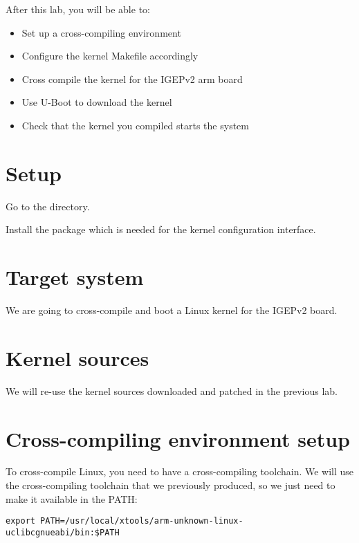 
After this lab, you will be able to:
\begin{itemize}
\item Set up a cross-compiling environment
\item Configure the kernel Makefile accordingly
\item Cross compile the kernel for the IGEPv2 arm board
\item Use U-Boot to download the kernel
\item Check that the kernel you compiled starts the system
\end{itemize}

\section{Setup}

Go to the  directory.

Install the package  which is needed for the
 kernel configuration interface.

\section{Target system}

We are going to cross-compile and boot a Linux kernel for the IGEPv2
board.

\section{Kernel sources}

We will re-use the kernel sources downloaded and patched in the
previous lab.

\section{Cross-compiling environment setup}

To cross-compile Linux, you need to have a cross-compiling
toolchain. We will use the cross-compiling toolchain that we
previously produced, so we just need to make it available in the PATH:

\begin{verbatim}
export PATH=/usr/local/xtools/arm-unknown-linux-uclibcgnueabi/bin:$PATH
\end{verbatim}

